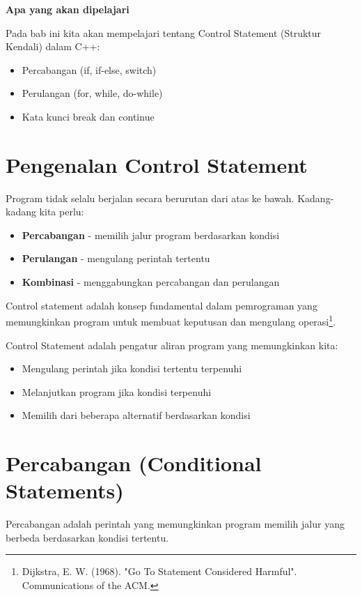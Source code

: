 \textbf{Apa yang akan dipelajari}

Pada bab ini kita akan mempelajari tentang Control Statement (Struktur Kendali) dalam C++:

\begin{itemize}
\item Percabangan (if, if-else, switch)
\item Perulangan (for, while, do-while)
\item Kata kunci break dan continue
\end{itemize}

\minitoc

\section{Pengenalan Control Statement}

Program tidak selalu berjalan secara berurutan dari atas ke bawah. Kadang-kadang kita perlu:
\begin{itemize}
\item \textbf{Percabangan} - memilih jalur program berdasarkan kondisi
\item \textbf{Perulangan} - mengulang perintah tertentu
\item \textbf{Kombinasi} - menggabungkan percabangan dan perulangan
\end{itemize}

Control statement adalah konsep fundamental dalam pemrograman yang memungkinkan program untuk membuat keputusan dan mengulang operasi\footnote{Dijkstra, E. W. (1968). "Go To Statement Considered Harmful". Communications of the ACM.}.

Control Statement adalah pengatur aliran program yang memungkinkan kita:
\begin{itemize}
\item Mengulang perintah jika kondisi tertentu terpenuhi
\item Melanjutkan program jika kondisi terpenuhi
\item Memilih dari beberapa alternatif berdasarkan kondisi
\end{itemize}

\section{Percabangan (Conditional Statements)}\label{percabangan}

Percabangan adalah perintah yang memungkinkan program memilih jalur yang berbeda berdasarkan kondisi tertentu.

